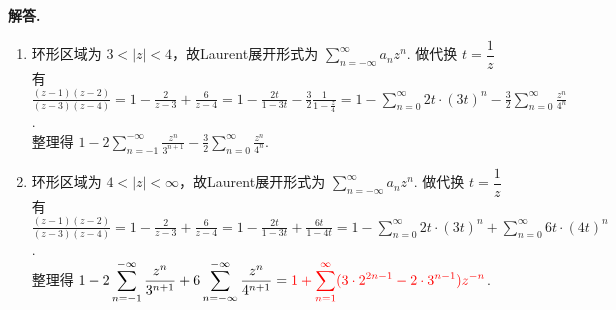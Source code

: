 \documentclass[11pt]{ctexart}
\newenvironment{solution}{\par\noindent\textbf{解答. }}{\par}
\begin{document}
\begin{solution}
\begin{enumerate}[(1)]
        \item 环形区域为 $3<\left|z\right|<4$，故Laurent展开形式为 $\displaystyle\sum_{n=-\infty}^{\infty}a_nz^n$. 做代换 $t=\dfrac{1}{z}$ 有\\[12pt]
              $\displaystyle\frac{(z-1)(z-2)}{(z-3)(z-4)} = 1 - \frac{2}{z-3} + \frac{6}{z-4}
              = 1 - \frac{2t}{1-3t} - \frac{3}{2}\frac{1}{1-\frac{z}{4}} = 1 - \sum_{n=0}^{\infty}2t\cdot(3t)^n - \frac{3}{2}\sum_{n=0}^{\infty}\frac{z^n}{4^n}$.\\[12pt]
              整理得 $\displaystyle 1 - 2\sum_{n=-1}^{-\infty}\frac{z^n}{3^{n+1}} - \frac{3}{2}\sum_{n=0}^{\infty}\frac{z^n}{4^n}$.
        \item 环形区域为 $4<\left|z\right|<\infty$，故Laurent展开形式为 $\displaystyle\sum_{n=-\infty}^{\infty}a_nz^n$. 做代换 $t=\dfrac{1}{z}$ 有\\[12pt]
              $\displaystyle\frac{(z-1)(z-2)}{(z-3)(z-4)} = 1 - \frac{2}{z-3} + \frac{6}{z-4} 
              = 1 - \frac{2t}{1-3t} + \frac{6t}{1-4t} = 1 - \sum_{n=0}^{\infty}2t\cdot(3t)^n + \sum_{n=0}^{\infty}6t\cdot(4t)^n$.\\[12pt]
              整理得 $\displaystyle 1 - 2\sum_{n=-1}^{-\infty}\frac{z^n}{3^{n+1}} + 6\sum_{n=-\infty}^{-\infty}\frac{z^n}{4^{n+1}} = \textcolor{red}{1 + \sum_{n=1}^{\infty}(3\cdot2^{2n-1}-2\cdot3^{n-1})z^{-n}}$.
    \end{enumerate}
\end{solution}
\end{document}
